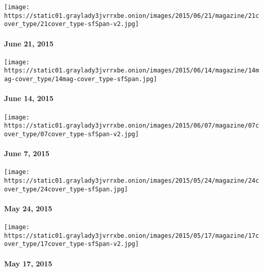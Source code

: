 \href{http://www.nytimes3xbfgragh.onion/indexes/2015/06/21/magazine/index.html}{}

\texttt{[image: https://static01.graylady3jvrrxbe.onion/images/2015/06/21/magazine/21cover\_type/21cover\_type-sfSpan-v2.jpg]}

\hypertarget{june-21-2015}{%
\paragraph{June 21, 2015}\label{june-21-2015}}

\href{http://www.nytimes3xbfgragh.onion/indexes/2015/06/14/magazine/index.html}{}

\texttt{[image: https://static01.graylady3jvrrxbe.onion/images/2015/06/14/magazine/14mag-cover\_type/14mag-cover\_type-sfSpan.jpg]}

\hypertarget{june-14-2015}{%
\paragraph{June 14, 2015}\label{june-14-2015}}

\href{http://www.nytimes3xbfgragh.onion/indexes/2015/06/07/magazine/index.html}{}

\texttt{[image: https://static01.graylady3jvrrxbe.onion/images/2015/06/07/magazine/07cover\_type/07cover\_type-sfSpan-v2.jpg]}

\hypertarget{june-7-2015}{%
\paragraph{June 7, 2015}\label{june-7-2015}}

\href{http://www.nytimes3xbfgragh.onion/indexes/2015/05/24/magazine/index.html}{}

\texttt{[image: https://static01.graylady3jvrrxbe.onion/images/2015/05/24/magazine/24cover\_type/24cover\_type-sfSpan.jpg]}

\hypertarget{may-24-2015}{%
\paragraph{May 24, 2015}\label{may-24-2015}}

\href{http://www.nytimes3xbfgragh.onion/indexes/2015/05/17/magazine/index.html}{}

\texttt{[image: https://static01.graylady3jvrrxbe.onion/images/2015/05/17/magazine/17cover\_type/17cover\_type-sfSpan-v2.jpg]}

\hypertarget{may-17-2015}{%
\paragraph{May 17, 2015}\label{may-17-2015}}

